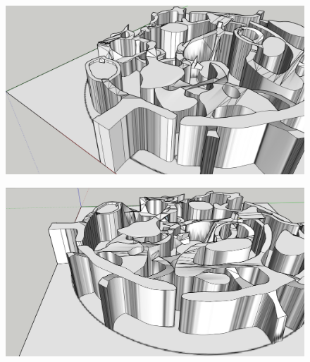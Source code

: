 \begin{figure}[H]
	\centering
	\includegraphics[width=14cm]{images/map/3D_map_013.png}
\end{figure}
\vspace*{3cm}
\begin{figure}[H]
	\centering
	\includegraphics[width=14cm]{images/map/3D_map_014.png}
\end{figure}